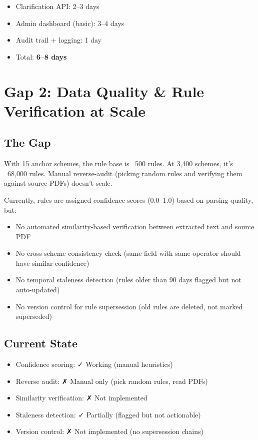 \documentclass[11pt,a4paper]{report}
\begin{document}
\begin{itemize}
  \item Clarification API: 2--3 days
  \item Admin dashboard (basic): 3--4 days
  \item Audit trail + logging: 1 day
  \item Total: \textbf{6--8 days}
\end{itemize}

\section{Gap 2: Data Quality \& Rule Verification at Scale}

\subsection{The Gap}

With 15 anchor schemes, the rule base is ~500 rules. At 3,400 schemes, it's ~68,000 rules. Manual reverse-audit (picking random rules and verifying them against source PDFs) doesn't scale.

Currently, rules are assigned confidence scores (0.0--1.0) based on parsing quality, but:

\begin{itemize}
  \item No automated similarity-based verification between extracted text and source PDF
  \item No cross-scheme consistency check (same field with same operator should have similar confidence)
  \item No temporal staleness detection (rules older than 90 days flagged but not auto-updated)
  \item No version control for rule supersession (old rules are deleted, not marked superseded)
\end{itemize}

\subsection{Current State}

\begin{itemize}
  \item Confidence scoring: ✓ Working (manual heuristics)
  \item Reverse audit: ✗ Manual only (pick random rules, read PDFs)
  \item Similarity verification: ✗ Not implemented
  \item Staleness detection: ✓ Partially (flagged but not actionable)
  \item Version control: ✗ Not implemented (no supersession chains)
\end{itemize}
\end{document}
